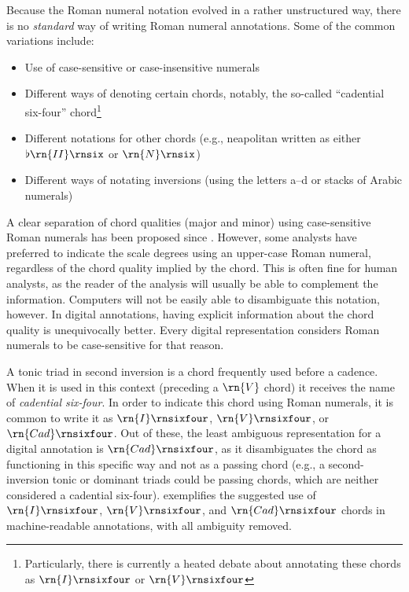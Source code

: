 

Because the Roman numeral notation evolved in a rather
unstructured way, there is no \emph{standard} way of writing
Roman numeral annotations. 
Some of the common variations include:

\begin{itemize}
    \item Use of case-sensitive or case-insensitive numerals
    \item Different ways of denoting certain chords,
    notably, the so-called ``cadential six-four''
    chord\footnote{Particularly, there is currently a heated
    debate about annotating these chords as
    $\rn{I}\rnsixfour$ or $\rn{V}\rnsixfour$}
    \item Different notations for other chords (e.g.,
    \gls{neapolitan} written as either $\flat\rn{II}\rnsix$
    or $\rn{N}\rnsix$)
    \item Different ways of notating inversions (using the
    letters a--d or stacks of Arabic numerals)
\end{itemize}

A clear separation of chord qualities (major and minor)
using case-sensitive Roman numerals has been proposed since
\textcite{weber1817versuch}. However, some analysts have
preferred to indicate the scale degrees using an upper-case
Roman numeral, regardless of the chord quality implied by
the chord. This is often fine for human analysts, as the
reader of the analysis will usually be able to complement
the information. Computers will not be easily able to
disambiguate this notation, however. In digital annotations,
having explicit information about the chord quality is
unequivocally better. Every digital representation considers
Roman numerals to be case-sensitive for that reason.

A tonic triad in second inversion is a chord frequently used
before a cadence. When it is used in this context (preceding
a $\rn{V}$ chord) it receives the name of \emph{cadential
six-four}. In order to indicate this chord using Roman
numerals, it is common to write it as $\rn{I}\rnsixfour$,
$\rn{V}\rnsixfour$, or $\rn{Cad}\rnsixfour$. Out of these,
the least ambiguous representation for a digital annotation
is $\rn{Cad}\rnsixfour$, as it disambiguates the chord as
functioning in this specific way and not as a passing chord
(e.g., a second-inversion tonic or dominant triads could be
passing chords, which are neither considered a cadential
six-four).  exemplifies the
suggested use of $\rn{I}\rnsixfour$, $\rn{V}\rnsixfour$, and
$\rn{Cad}\rnsixfour$ chords in machine-readable annotations,
with all ambiguity removed.

